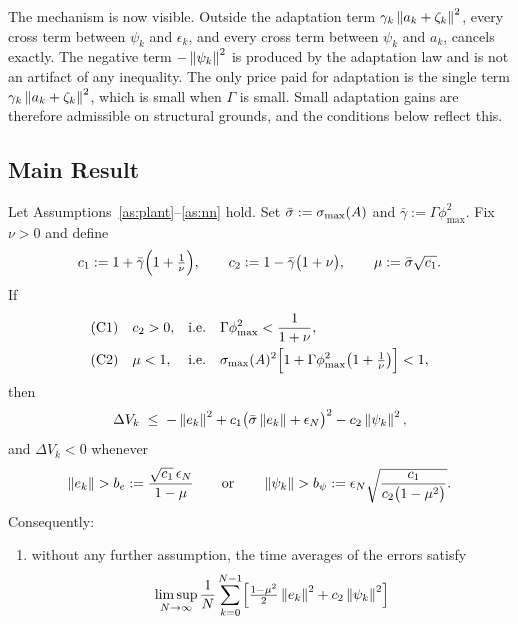 The mechanism is now visible. Outside the adaptation term
$\gamma_k\left\lVert a_k+\zeta_k \right\rVert^2$, every cross term between $\psi_k$ and
$\epsilon_k$, and every cross term between $\psi_k$ and $a_k$, cancels exactly.
The negative term $-\left\lVert \psi_k \right\rVert^2$ is produced by the adaptation law and is
not an artifact of any inequality. The only price paid for adaptation is the
single term $\gamma_k\left\lVert a_k+\zeta_k \right\rVert^2$, which is small when $\Gamma$ is
small. Small adaptation gains are therefore admissible on structural grounds, and
the conditions below reflect this.

\subsection{Main Result}

\begin{theorem}\label{thm:main}
Let Assumptions~\ref{as:plant}--\ref{as:nn} hold. Set
$\bar\sigma:=\sigma_{\max}(A)$ and $\bar\gamma:=\Gamma\phi_{\max}^2$. Fix $\nu>0$
and define
\begin{equation}\label{eq:cs}
c_1:=1+\bar\gamma\Bigl(1+\tfrac{1}{\nu}\Bigr),\qquad
c_2:=1-\bar\gamma\bigl(1+\nu\bigr),\qquad
\mu:=\bar\sigma\sqrt{c_1}.
\end{equation}
If
\begin{align}
&\text{\rm(C1)}\quad c_2>0,
&&\text{i.e.}\quad \Gamma\phi_{\max}^2<\frac{1}{1+\nu},
\label{eq:C1}\\
&\text{\rm(C2)}\quad \mu<1,
&&\text{i.e.}\quad
\sigma_{\max}(A)^2\Bigl[1+\Gamma\phi_{\max}^2\bigl(1+\tfrac{1}{\nu}\bigr)\Bigr]<1,
\label{eq:C2}
\end{align}
then
\begin{equation}\label{eq:master}
\Delta V_k\;\le\;-\left\lVert e_k \right\rVert^2
+c_1\bigl(\bar\sigma\left\lVert e_k \right\rVert+\epsilon_N\bigr)^2
-c_2\left\lVert \psi_k \right\rVert^2,
\end{equation}
and $\Delta V_k<0$ whenever
\begin{equation}\label{eq:bounds}
\left\lVert e_k \right\rVert>b_e:=\frac{\sqrt{c_1}\,\epsilon_N}{1-\mu}
\qquad\text{or}\qquad
\left\lVert \psi_k \right\rVert>b_\psi:=\epsilon_N\sqrt{\frac{c_1}{c_2\bigl(1-\mu^2\bigr)}} .
\end{equation}
Consequently:
\begin{enumerate}[label=(\alph*),leftmargin=*]
\item without any further assumption, the time averages of the errors satisfy
\begin{equation}\label{eq:msbound}
\limsup_{N\to\infty}\frac{1}{N}\sum_{k=0}^{N-1}
\Bigl[\tfrac{1-\mu^2}{2}\norm{e_k}^2+c_2\norm{\psi_k}^2\Bigr]

\end{equation}
\end{enumerate}
\end{theorem}
